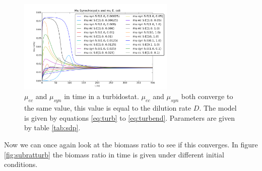 \documentclass[10pt]{report}
\begin{document}
\begin{figure}[htbp]
    \hfill
  \begin{minipage}{.45\textwidth}
   \begin{center}
     \includegraphics[width=7.5cm]{sub_dependent_turbidostat_mus.png}
     \caption{$\mu_{ec}$ and $\mu_{syn}$ in time in a turbidostat. $\mu_{ec}$ and $\mu_{syn}$ both converge to the same value, this value is equal to the dilution rate $D$. The model is given by equations \ref{eq:turb} to \ref{eq:turbend}. Parameters are given by table \ref{tab:sdp}.}
    \label{fig:submusratturb}
   \end{center}
  \end{minipage}
\end{figure}



Now we can once again look at the biomass ratio to see if this converges. In figure \ref{fig:subratturb} the biomass ratio in time is given under different initial conditions.

\end{document}
